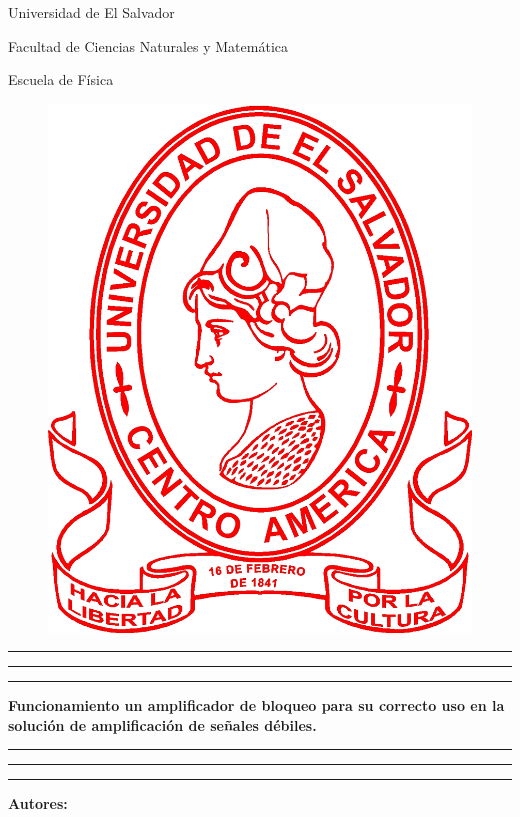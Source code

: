 \begin{titlepage}
\centering

\vspace*{0.5cm}

{\huge Universidad de El Salvador}

{\LARGE Facultad de Ciencias Naturales y Matemática}

{\LARGE Escuela de Física}


\begin{figure}[h!] 
\centering 
\includegraphics[width=0.25\linewidth]{Chapters/1_Portada/Cover_Figures/UniversidaddeElSalvador_Logo.png} 
\end{figure}

\hrule \hrule \hrule

\vspace*{0.25cm}

\textbf{ \LARGE Funcionamiento un amplificador de bloqueo para su correcto uso en la solución de amplificación de señales débiles. \\ \vspace{5px} }

\vspace*{0.25cm}

\hrule \hrule \hrule

\vspace*{0.25cm}

{\large

\textbf{Autores:}

\begin{tabular}[t]{lr}

\end{tabular}
\\[0.5cm]

}
\end{titlepage}
